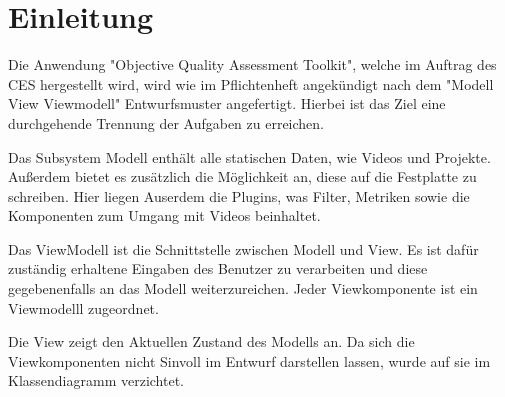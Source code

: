 \chapter{Einleitung}

Die Anwendung "Objective Quality Assessment Toolkit", welche im Auftrag des CES hergestellt wird, wird wie im Pflichtenheft angekündigt nach dem "Modell View Viewmodell" Entwurfsmuster angefertigt.
Hierbei ist das Ziel eine durchgehende Trennung der Aufgaben zu erreichen.

Das Subsystem Modell enthält alle statischen Daten, wie Videos und Projekte. Außerdem bietet es zusätzlich die Möglichkeit an, diese auf die Festplatte zu schreiben. Hier liegen Auserdem die Plugins, was Filter, Metriken sowie die Komponenten zum Umgang mit Videos beinhaltet.

Das ViewModell ist die Schnittstelle zwischen Modell und View. Es ist  dafür zuständig erhaltene Eingaben des Benutzer zu verarbeiten und diese gegebenenfalls an das Modell weiterzureichen. Jeder Viewkomponente ist ein Viewmodelll zugeordnet.

Die View zeigt den Aktuellen Zustand des Modells an. Da sich die Viewkomponenten nicht Sinvoll im Entwurf darstellen lassen, wurde auf sie im Klassendiagramm verzichtet.